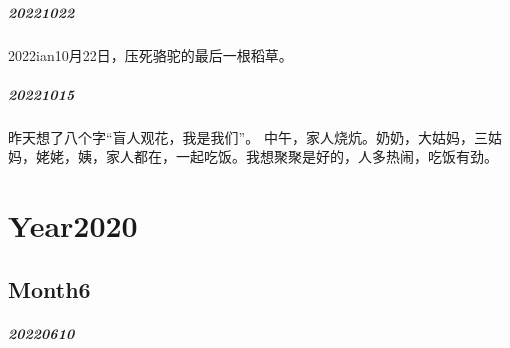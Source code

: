 \documentclass[UTF8]{book}
\begin{document}
\paragraph{20221022}
2022ian10月22日，压死骆驼的最后一根稻草。

\paragraph{20221015}
昨天想了八个字“盲人观花，我是我们”。
中午，家人烧炕。奶奶，大姑妈，三姑妈，姥姥，姨，家人都在，一起吃饭。我想聚聚是好的，人多热闹，吃饭有劲。


\chapter{Year2020}
\section{Month6}
\paragraph{20220610}
\end{document}
